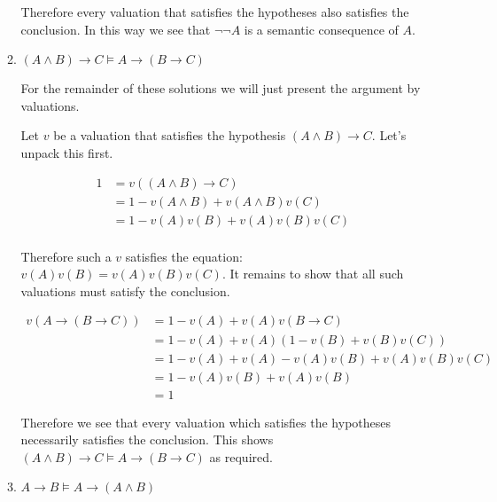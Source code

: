 \documentclass[11pt]{report}
\begin{document}
\begin{enumerate}
\begin{enumerate}
		Therefore every valuation that satisfies the hypotheses also satisfies the conclusion. In this way we see that $\lnot \lnot A$ is a semantic consequence of $A$. 

		\item $( A \land  B) \rightarrow  C \models  A \rightarrow ( B \rightarrow  C)$
		
		\hspace{0.2cm}{\bf Solution}

		For the remainder of these solutions we will just present the argument by valuations.

		Let $v$ be a valuation that satisfies the hypothesis $( A \land  B) \rightarrow  C$. Let's unpack this first. 

		\begin{equation*}
			\begin{split}
				1 &= v((A \land B) \rightarrow C)\\
				&= 1 - v(A \land B) + v(A \land B)v(C)\\
				&= 1 - v(A)v(B) + v(A)v(B)v(C)\\
			\end{split}
		\end{equation*}

		Therefore such a $v$ satisfies the equation: $v(A)v(B) = v(A)v(B)v(C)$. It remains to show that all such valuations must satisfy the conclusion. 

		\begin{equation*}
			\begin{split}
				v(A \to (B \to C)) &= 1 - v(A) + v(A)v(B \to C)\\
				&= 1 - v(A) + v(A)(1 - v(B) + v(B)v(C))\\
				&= 1 - v(A) + v(A) - v(A)v(B) + v(A)v(B)v(C)\\
				&= 1 - v(A)v(B) + v(A)v(B)\\
				&= 1
			\end{split}
		\end{equation*}

		Therefore we see that every valuation which satisfies the hypotheses necessarily satisfies the conclusion. This shows $( A \land  B) \rightarrow  C \models  A \rightarrow ( B \rightarrow  C)$ as required. 

		\newpage
		\item $ A \rightarrow  B \models  A \rightarrow ( A \land  B)$
		
		\hspace{0.2cm}{\bf Solution}


\end{enumerate}
\end{enumerate}
\end{document}
